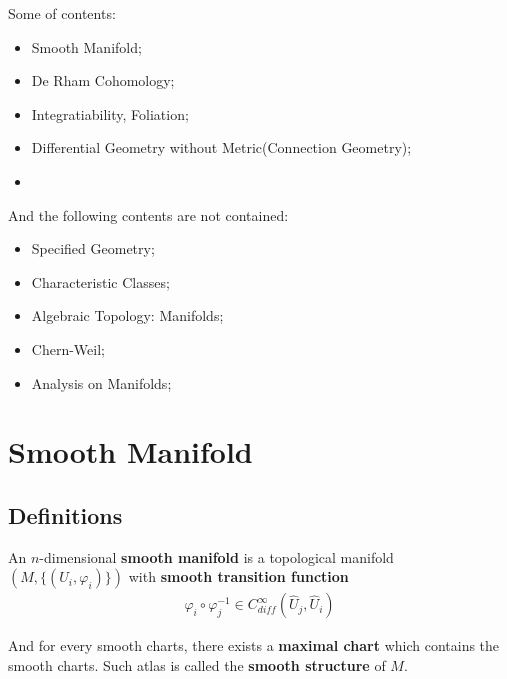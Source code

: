 \documentclass[Total.tex]{subfiles}
\begin{document}
	Some of contents:
	\begin{itemize}
		\item Smooth Manifold;
		\item De Rham Cohomology;
		\item Integratiability, Foliation;
		\item Differential Geometry without Metric(Connection Geometry);
		\item 
	\end{itemize}
	
	And the following contents are not contained:
	\begin{itemize}
		\item Specified Geometry;
		\item Characteristic Classes;
		\item Algebraic Topology: Manifolds;
		\item Chern-Weil;
		\item Analysis on Manifolds;
	\end{itemize}
	\chapter{Smooth Manifold}
		\section{Definitions}
			\begin{Def}
				An $n$-dimensional \textbf{smooth manifold} is a topological manifold $(M,\{(U_i,\varphi_i)\})$ with \textbf{smooth transition function}
				\begin{gather*}
					\varphi_i\circ\varphi_j^{-1}\in C^\infty_{diff}(\hat{U}_j,\hat{U}_i)
				\end{gather*}
			\end{Def}
			And for every smooth charts, there exists a \textbf{maximal chart} which contains the smooth charts. Such atlas is called the \textbf{smooth structure} of $M$.
			
\end{document}
